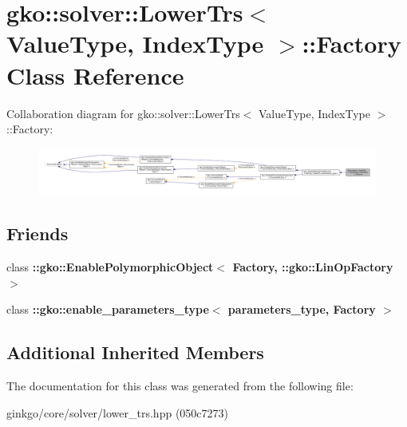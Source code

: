 \hypertarget{classgko_1_1solver_1_1LowerTrs_1_1Factory}{}\section{gko\+:\+:solver\+:\+:Lower\+Trs$<$ Value\+Type, Index\+Type $>$\+:\+:Factory Class Reference}
\label{classgko_1_1solver_1_1LowerTrs_1_1Factory}


Collaboration diagram for gko\+:\+:solver\+:\+:Lower\+Trs$<$ Value\+Type, Index\+Type $>$\+:\+:Factory\+:
\nopagebreak
\begin{figure}[H]
\begin{center}
\leavevmode
\includegraphics[width=350pt]{classgko_1_1solver_1_1LowerTrs_1_1Factory__coll__graph}
\end{center}
\end{figure}
\subsection*{Friends}
\begin{DoxyCompactItemize}
\item 
\mbox{\label{classgko_1_1solver_1_1LowerTrs_1_1Factory_a27e9bbc94a1c1c59f40833153eda8f78}} 
class {\bfseries \+::gko\+::\+Enable\+Polymorphic\+Object$<$ Factory, \+::gko\+::\+Lin\+Op\+Factory $>$}
\item 
\mbox{\label{classgko_1_1solver_1_1LowerTrs_1_1Factory_a0d176cbd42d6214e11aee8c30ca256fc}} 
class {\bfseries \+::gko\+::enable\+\_\+parameters\+\_\+type$<$ parameters\+\_\+type, Factory $>$}
\end{DoxyCompactItemize}
\subsection*{Additional Inherited Members}


The documentation for this class was generated from the following file\+:\begin{DoxyCompactItemize}
\item 
ginkgo/core/solver/lower\+\_\+trs.\+hpp (050c7273)\end{DoxyCompactItemize}

